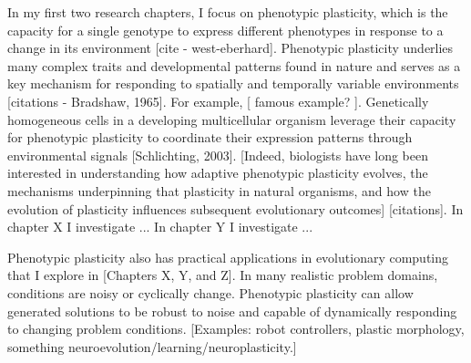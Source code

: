 In my first two research chapters, I focus on phenotypic plasticity, which is the capacity for a single genotype to express different phenotypes in response to a change in its environment [cite - west-eberhard].
Phenotypic plasticity underlies many complex traits and developmental patterns found in nature and serves as a key mechanism for responding to spatially and temporally variable environments [citations - Bradshaw, 1965].
For example, [ famous example? ].
Genetically homogeneous cells in a developing multicellular organism leverage their capacity for phenotypic plasticity to coordinate their expression patterns through environmental signals [Schlichting, 2003].
[Indeed, biologists have long been interested in understanding how adaptive phenotypic plasticity evolves, the mechanisms underpinning that plasticity in natural organisms, and how the evolution of plasticity influences subsequent evolutionary outcomes] [citations].
In chapter X I investigate ...
In chapter Y I investigate ...


Phenotypic plasticity also has practical applications in evolutionary computing that I explore in [Chapters X, Y, and Z].
In many realistic problem domains, conditions are noisy or cyclically change.
Phenotypic plasticity can allow generated solutions to be robust to noise and capable of dynamically responding to changing problem conditions.
[Examples: robot controllers, plastic morphology, something neuroevolution/learning/neuroplasticity.]

